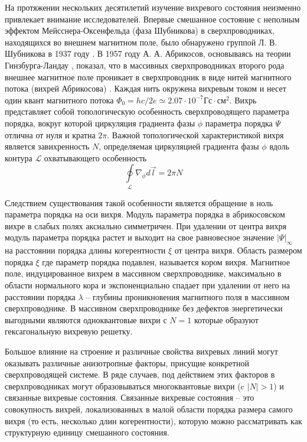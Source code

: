 На протяжении нескольких десятилетий изучение вихревого состояния неизменно 
привлекает внимание исследователей. Впервые смешанное состояние с неполным 
эффектом Мейсснера-Оксенфельда (фаза Шубникова) в сверхпроводниках, 
находящихся во внешнем магнитном поле, было обнаружено группой Л. В. 
Шубникова в 1937 году \cite{shubnikov}. В 1957 году А. А. Абрикосов, 
основываясь на теории Гинзбурга-Ландау \cite{ginzburg-landau}, показал, что в 
массивных сверхпроводниках второго рода внешнее магнитное поле проникает в 
сверхпроводник в виде нитей магнитного потока (вихрей Абрикосова)
\cite{abrikosov}. Каждая нить окружена вихревым током и несет один квант 
магнитного потока 
\( \Phi_0 = hc/2e \simeq 2.07\cdot10^{-7} \text{Гс}\cdot\text{см}^2 \). Вихрь 
представляет собой топологическую особенность сверхпроводящего параметра 
порядка, вокруг которой циркуляция градиента фазы \( \phi \) параметра порядка 
\( \Psi \) отлична от нуля и кратна \( 2\pi \). Важной топологической 
характеристикой вихря является завихренность \( N \), определяемая циркуляцией 
градиента фазы \( \phi \) вдоль контура \( \mathcal{L} \) охватывающего 
особенность 
\begin{equation}
    \oint\limits_{\mathcal{L}} \nabla_\phi d\vec{l} = 2\pi N
\end{equation}

Следствием существования такой особенности является обращение в ноль параметра 
порядка на оси вихря. Модуль параметра порядка в абрикосовском вихре в слабых 
полях аксиально симметричен. При удалении от центра вихря модуль параметра 
порядка растет и выходит на свое равновесное значение \( |\Psi|_\infty \) на 
расстоянии порядка длины когерентности \( \xi \) от центра вихря. Область 
размером порядка \( \xi \) где параметр порядка подавлен, называется кором 
вихря. Магнитное поле, индуцированное вихрем в массивном сверхпроводнике, 
максимально в области нормального кора и экспоненциально спадает при удалении 
от него на расстоянии порядка \( \lambda \) -- глубины проникновения магнитного 
поля в массивном сверхпроводнике. В массивном сверхпроводнике без дефектов 
энергетически выгодными являются одноквантовые вихри с \( N = 1 \) которые 
образуют гексагональную вихревую решетку.

Большое влияние на строение и различные свойства вихревых линий могут 
оказывать различные анизотропные факторы, присущие конкретной сверхпроводящей 
системе. В ряде случаев, под действием этих факторов в сверхпроводниках могут 
образовываться многоквантовые вихри (c \( |N| > 1 \)) и связанные вихревые
состояния. Связанные вихревые состояния -- это совокупность вихрей, 
локализованных в малой области порядка размера самого вихря (то есть, 
несколько длин когерентности), которую можно рассматривать как структурную 
единицу смешанного состояния.

